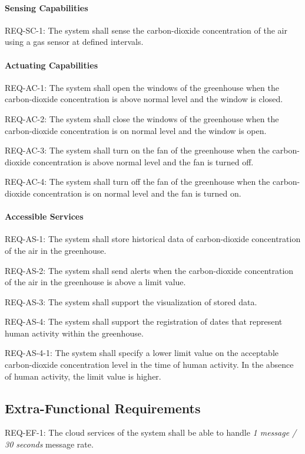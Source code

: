 \documentclass[a4paper, 11pt]{article}
\begin{document}
	\paragraph{Sensing Capabilities}
	REQ-SC-1: The system shall sense the carbon-dioxide concentration of the air using a gas sensor at defined intervals.
	
	\paragraph{Actuating Capabilities}
	REQ-AC-1: The system shall open the windows of the greenhouse when the carbon-dioxide concentration is above normal level and the window is closed.
	
	REQ-AC-2: The system shall close the windows of the greenhouse when the carbon-dioxide concentration is on normal level and the window is open.
	
	REQ-AC-3: The system shall turn on the fan of the greenhouse when the carbon-dioxide concentration is above normal level and the fan is turned off. 
	
	REQ-AC-4: The system shall turn off the fan of the greenhouse when the carbon-dioxide concentration is on normal level and the fan is turned on.
	
	\paragraph{Accessible Services}
	
	REQ-AS-1: The system shall store historical data of carbon-dioxide concentration of the air in the greenhouse.
	
	REQ-AS-2: The system shall send alerts when the carbon-dioxide concentration of the air in the greenhouse is above a limit value.
	
	REQ-AS-3: The system shall support the visualization of stored data.
	
	REQ-AS-4: The system shall support the registration of dates that represent human activity within the greenhouse.
	
	REQ-AS-4-1: The system shall specify a lower limit value on the acceptable carbon-dioxide concentration level in the time of human activity. In the absence of human activity, the limit value is higher.
	
	\subsection{Extra-Functional Requirements}
	REQ-EF-1: The cloud services of the system shall be able to handle \textsl{1 message / 30 seconds} message rate. 
	
\end{document}
